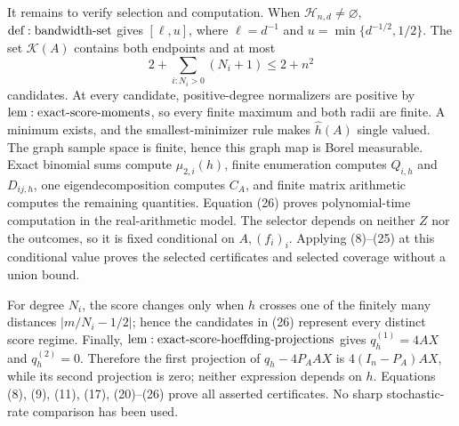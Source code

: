 It remains to verify selection and computation.  When \(\mathcal H_{n,d}\ne\varnothing\), \({\rm def:bandwidth\text{-}set}\) gives \([\ell,u]\), where \(\ell=d^{-1}\) and \(u=\min\{d^{-1/2},1/2\}\).  The set \(\mathcal K(A)\) contains both endpoints and at most
\[
 2+\sum_{i:N_i>0}(N_i+1)\leq2+n^2
\tag{26}
\]
candidates.  At every candidate, positive-degree normalizers are positive by \({\rm lem:exact\text{-}score\text{-}moments}\), so every finite maximum and both radii are finite.  A minimum exists, and the smallest-minimizer rule makes \(\widehat h(A)\) single valued.  The graph sample space is finite, hence this graph map is Borel measurable.  Exact binomial sums compute \(\mu_{2,i}(h)\), finite enumeration computes \(Q_{i,h}\) and \(D_{ij,h}\), one eigendecomposition computes \(C_A\), and finite matrix arithmetic computes the remaining quantities.  Equation (26) proves polynomial-time computation in the real-arithmetic model.  The selector depends on neither \(Z\) nor the outcomes, so it is fixed conditional on \(A,(f_i)_i\).  Applying (8)--(25) at this conditional value proves the selected certificates and selected coverage without a union bound.

For degree \(N_i\), the score changes only when \(h\) crosses one of the finitely many distances \(|m/N_i-1/2|\); hence the candidates in (26) represent every distinct score regime.  Finally, \({\rm lem:exact\text{-}score\text{-}hoeffding\text{-}projections}\) gives \(q_h^{(1)}=4AX\) and \(q_h^{(2)}=0\).  Therefore the first projection of \(q_h-4P_AAX\) is \(4(I_n-P_A)AX\), while its second projection is zero; neither expression depends on \(h\).  Equations (8), (9), (11), (17), (20)--(26) prove all asserted certificates.  No sharp stochastic-rate comparison has been used.